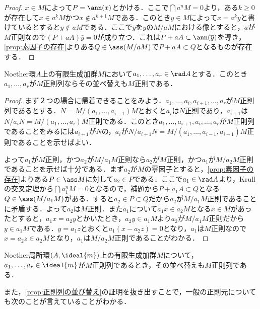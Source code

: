 \begin{proof}
	$x\in M$によって$P=\ann (x)$とかける．ここで$\bigcap a^nM=0$より，ある$k\geq0$が存在して$x\in a^kM$かつ$x\not\in a^{k+1}M$である．このとき$y\in M$によって$x=a^ky$と書けているとすると$y\not\in aM$である．ここで$\bar{y}$を$y$の$M/aM$における像とすると，$a$が$M$正則なので$(P+aA)\bar{y}=0$が成り立つ．これは$P+aA \subset\ann (\bar{y})$を導き，\ref{prop:素因子の存在}よりある$Q\in\ass (M/aM)$で$P+aA\subset Q$となるものが存在する．
\end{proof}

\begin{prop}\label{prop:正則列の並び替え}
	Noether環$A$上の有限生成加群$M$において$a_1,\dots,a_r\in\rad A$とする．このとき$a_1,\dots,a_r$が$M$正則列ならその並べ替えも$M$正則である．
\end{prop}

\begin{proof}
	まず２つの場合に帰着できることをみよう．$a_1,\dots,a_i,a_{i+1},\dots,a_r$が$M$正則列であるとする．$N=M/(a_1,\dots,a_{i-1})M$とおくと$a_i$は$N$正則であり，$a_{i+1}$は$N/a_iN=M/(a_1,\dots,a_i)M$正則である．このとき$a_1,\dots,a_{i+1},a_i,\dots,a_r$が$M$正則列であることをみるには$a_{i+1}$が$N$の，$a_i$が$N/a_{i+1}N=M/(a_1,\dots,a_{i-1},a_{i+1})M$正則であることを示せばよい．
	
	よって$a_1$が$M$正則，かつ$a_2$が$M/a_1M$正則なら$a_2$が$M$正則，かつ$a_1$が$M/a_2M$正則であることを示せば十分である．まず$a_2$が$M$の零因子とすると，\ref{prop:素因子の存在}よりある$P\in\ass M$に対して$a_2\in P$である．ここで$a_1\in\rad A$より，Krullの交叉定理から$\bigcap a_1^nM=0$となるので，補題から$P+a_1A \subset Q$となる$Q\in\ass (M/a_1M)$がある．すると$a_2\in P\subset Q$だから$a_2$が$M/a_1M$正則であることに矛盾する．よって$a_2$は$M$正則．また$a_1$について$a_1x\in a_2M$となる$x\in M$があったとすると，$a_1x=a_2y$とかいたとき，$a_2y\in a_1M$より$a_2$が$M/a_1M$正則だから$y\in a_1M$である．$y=a_1z$とおくと$a_1(x-a_2z)=0$となり，$a_1$は$M$正則なので$x=a_2z\in a_2M$となり，$a_1$は$M/a_2M$正則であることがわかる．
\end{proof}

\begin{cor}
	Noether局所環$(A,\ideal{m})$上の有限生成加群$M$について，$a_1,\dots,a_r\in\ideal{m}$が$M$正則列であるとき，その並べ替えも$M$正則列である．
\end{cor}

また，\ref{prop:正則列の並び替え}の証明を抜き出すことで，一般の正則元についても次のことが言えていることがわかる．

